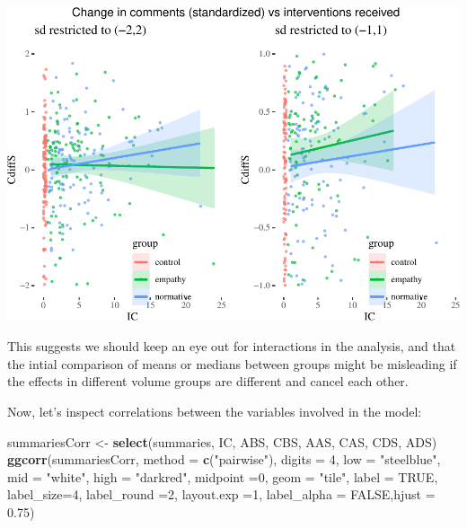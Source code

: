 \documentclass[10pt,dvipsnames,enabledeprecatedfontcommands]{scrartcl}
\newenvironment{Shaded}{\begin{snugshade}}{\end{snugshade}}
\newcommand{\KeywordTok}[1]{\textcolor[rgb]{0.13,0.29,0.53}{\textbf{#1}}}
\newcommand{\DataTypeTok}[1]{\textcolor[rgb]{0.13,0.29,0.53}{#1}}
\newcommand{\DecValTok}[1]{\textcolor[rgb]{0.00,0.00,0.81}{#1}}
\newcommand{\FloatTok}[1]{\textcolor[rgb]{0.00,0.00,0.81}{#1}}
\newcommand{\StringTok}[1]{\textcolor[rgb]{0.31,0.60,0.02}{#1}}
\newcommand{\OtherTok}[1]{\textcolor[rgb]{0.56,0.35,0.01}{#1}}
\newcommand{\NormalTok}[1]{#1}
\begin{document}
\begin{center}\includegraphics[width=1\linewidth]{bayesianReport_files/figure-latex/unnamed-chunk-8-1} \end{center}

\normalsize

This suggests we should keep an eye out for interactions in the
analysis, and that the intial comparison of means or medians between
groups might be misleading if the effects in different volume groups are
different and cancel each other.

Now, let's inspect correlations between the variables involved in the
model:

\vspace{1mm} \footnotesize

\begin{Shaded}
\begin{Highlighting}[]
\NormalTok{summariesCorr <-}\StringTok{ }\KeywordTok{select}\NormalTok{(summaries, IC, ABS, CBS, AAS, CAS, CDS, ADS)}
\KeywordTok{ggcorr}\NormalTok{(summariesCorr, }\DataTypeTok{method =} \KeywordTok{c}\NormalTok{(}\StringTok{"pairwise"}\NormalTok{),}
       \DataTypeTok{digits =} \DecValTok{4}\NormalTok{, }\DataTypeTok{low =} \StringTok{"steelblue"}\NormalTok{, }\DataTypeTok{mid =} \StringTok{"white"}\NormalTok{,}
       \DataTypeTok{high =} \StringTok{"darkred"}\NormalTok{, }\DataTypeTok{midpoint =}\DecValTok{0}\NormalTok{,}
       \DataTypeTok{geom =} \StringTok{"tile"}\NormalTok{, }\DataTypeTok{label =} \OtherTok{TRUE}\NormalTok{, }\DataTypeTok{label_size=}\DecValTok{4}\NormalTok{, }\DataTypeTok{label_round =}\DecValTok{2}\NormalTok{, }\DataTypeTok{layout.exp =}\DecValTok{1}\NormalTok{,}
       \DataTypeTok{label_alpha =} \OtherTok{FALSE}\NormalTok{,}\DataTypeTok{hjust =} \FloatTok{0.75}\NormalTok{)}
\end{Highlighting}
\end{Shaded}
\end{document}
